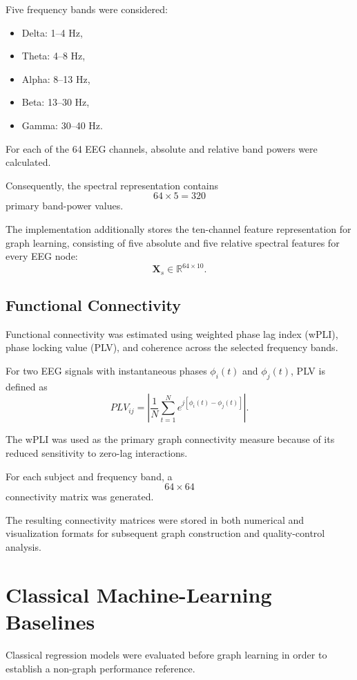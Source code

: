 \documentclass[conference]{IEEEtran}
\begin{document}
Five frequency bands were considered:
\begin{itemize}
\item Delta: 1--4 Hz,
\item Theta: 4--8 Hz,
\item Alpha: 8--13 Hz,
\item Beta: 13--30 Hz,
\item Gamma: 30--40 Hz.
\end{itemize}

For each of the 64 EEG channels, absolute and relative band powers were calculated.

Consequently, the spectral representation contains
\begin{equation}
64 \times 5 = 320
\end{equation}
primary band-power values.

The implementation additionally stores the ten-channel feature representation for graph learning, consisting of five absolute and five relative spectral features for every EEG node:
\begin{equation}
\mathbf{X}_s \in \mathbb{R}^{64 \times 10}.
\end{equation}

\subsection{Functional Connectivity}
Functional connectivity was estimated using weighted phase lag index (wPLI), phase locking value (PLV), and coherence across the selected frequency bands.

For two EEG signals with instantaneous phases $\phi_i(t)$ and $\phi_j(t)$, PLV is defined as
\begin{equation}
PLV_{ij} = \left| \frac{1}{N} \sum_{t=1}^{N} e^{j[\phi_i(t) - \phi_j(t)]} \right|.
\end{equation}

The wPLI was used as the primary graph connectivity measure because of its reduced sensitivity to zero-lag interactions.

For each subject and frequency band, a
\begin{equation}
64 \times 64
\end{equation}
connectivity matrix was generated.

The resulting connectivity matrices were stored in both numerical and visualization formats for subsequent graph construction and quality-control analysis.

\section{Classical Machine-Learning Baselines}
Classical regression models were evaluated before graph learning in order to establish a non-graph performance reference.
\end{document}
